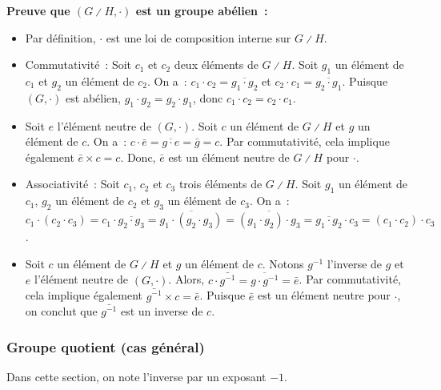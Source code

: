 \noindent\textbf{Preuve que $(G \divslash H, \cdot)$ est un groupe abélien :}
\begin{itemize}[nosep]
    \item Par définition, $\cdot$ est une loi de composition interne sur $G \divslash H$.
    \item Commutativité : Soit $c_1$ et $c_2$ deux éléments de $G \divslash H$.
        Soit $g_1$ un élément de $c_1$ et $g_2$ un élément de $c_2$. 
        On a : $c_1 \cdot c_2 = \overline{g_1 \cdot g_2}$ et $c_2 \cdot c_1 = \overline{g_2 \cdot g_1}$.
        Puisque $(G, \cdot)$ est abélien, $g_1 \cdot g_2 = g_2 \cdot g_1$, donc $c_1 \cdot c_2 = c_2 \cdot c_1$.
    \item Soit $e$ l'élément neutre de $(G, \cdot)$. 
        Soit $c$ un élément de $G \divslash H$ et $g$ un élément de $c$. 
        On a : $c \cdot \bar{e} = \overline{g \cdot e} = \bar{g} = c$.
        Par commutativité, cela implique également $\bar{e} \times c = c$.
        Donc, $\bar{e}$ est un élément neutre de $G \divslash H$ pour $\cdot$.
    \item Associativité : Soit $c_1$, $c_2$ et $c_3$ trois éléments de $G \divslash H$.
        Soit $g_1$ un élément de $c_1$, $g_2$ un élément de $c_2$ et $g_3$ un élément de $c_3$.
        On a : $c_1 \cdot (c_2 \cdot c_3) = c_1 \cdot \overline{g_2 \cdot g_3} = \overline{g_1 \cdot (g_2 \cdot g_3)} = \overline{(g_1 \cdot g_2) \cdot g_3} = \overline{g_1 \cdot g_2} \cdot c_3 = (c_1 \cdot c_2) \cdot c_3$.
    \item Soit $c$ un élément de $G \divslash H$ et $g$ un élément de $c$. 
        Notons $g^{-1}$ l'inverse de $g$ et $e$ l'élément neutre de $(G,\cdot)$. 
        Alors, $c \cdot \bar{g^{-1}} = \overline{g \cdot g^{-1}} = \bar{e}$.
        Par commutativité, cela implique également $\bar{g^{-1}} \times c = \bar{e}$.
        Puisque $\bar{e}$ est un élément neutre pour $\cdot$, on conclut que $\bar{g^{-1}}$ est un inverse de $c$.
\end{itemize}

\done

\subsubsection{Groupe quotient (cas général)}


\noindent
Dans cette section, on note l'inverse par un exposant $-1$.

\medskip


